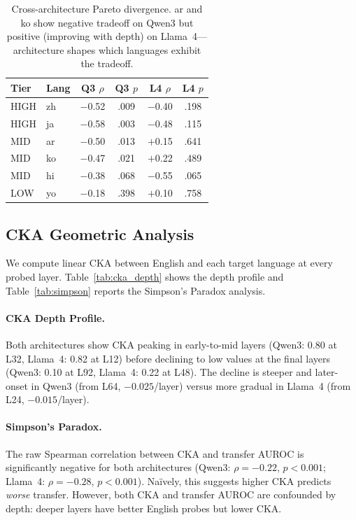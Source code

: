 \documentclass[11pt,a4paper]{article}
\newcommand{\auroc}{AUROC}
\begin{document}
\begin{table}[t]
\centering
\small
\begin{tabular}{llcccc}
\toprule
Tier & Lang & Q3 $\rho$ & Q3 $p$ & L4 $\rho$ & L4 $p$ \\
\midrule
HIGH & zh & $-$0.52 & .009 & $-$0.40 & .198 \\
HIGH & ja & $-$0.58 & .003 & $-$0.48 & .115 \\
MID & ar & $-$0.50 & .013 & $+$0.15 & .641 \\
MID & ko & $-$0.47 & .021 & $+$0.22 & .489 \\
MID & hi & $-$0.38 & .068 & $-$0.55 & .065 \\
LOW & yo & $-$0.18 & .398 & $+$0.10 & .758 \\
\bottomrule
\end{tabular}
\caption{Cross-architecture Pareto divergence. ar and ko show negative tradeoff on Qwen3 but positive (improving with depth) on Llama~4---architecture shapes which languages exhibit the tradeoff.}
\label{tab:arch_diverge}
\end{table}


\subsection{CKA Geometric Analysis}
\label{sec:cka}

We compute linear CKA between English and each target language at every probed layer. Table~\ref{tab:cka_depth} shows the depth profile and Table~\ref{tab:simpson} reports the Simpson's Paradox analysis.

\paragraph{CKA Depth Profile.}
Both architectures show CKA peaking in early-to-mid layers (Qwen3: 0.80 at L32, Llama~4: 0.82 at L12) before declining to low values at the final layers (Qwen3: 0.10 at L92, Llama~4: 0.22 at L48). The decline is steeper and later-onset in Qwen3 (from L64, $-0.025$/layer) versus more gradual in Llama~4 (from L24, $-0.015$/layer).

\paragraph{Simpson's Paradox.}
The raw Spearman correlation between CKA and transfer \auroc{} is significantly negative for both architectures (Qwen3: $\rho=-0.22$, $p<0.001$; Llama~4: $\rho=-0.28$, $p<0.001$). Na\"ively, this suggests higher CKA predicts \emph{worse} transfer. However, both CKA and transfer \auroc{} are confounded by depth: deeper layers have better English probes but lower CKA.
\end{document}
